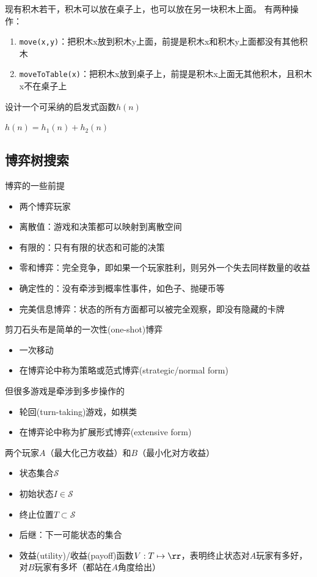 \begin{example}
现有积木若干，积木可以放在桌子上，也可以放在另一块积木上面。
有两种操作：
\begin{enumerate}
	\item \verb'move(x,y)'：把积木x放到积木y上面，前提是积木x和积木y上面都没有其他积木
	\item \verb'moveToTable(x)'：把积木x放到桌子上，前提是积木x上面无其他积木，且积木x不在桌子上
\end{enumerate}
设计一个可采纳的启发式函数$h(n)$
\end{example}
\begin{analysis}
$h(n)=h_1(n)+h_2(n)$
\end{analysis}

\subsection{博弈树搜索}
博弈的一些前提
\begin{itemize}
	\item 两个博弈玩家
	\item 离散值：游戏和决策都可以映射到离散空间
	\item 有限的：只有有限的状态和可能的决策
	\item 零和博弈：完全竞争，即如果一个玩家胜利，则另外一个失去同样数量的收益
	\item 确定性的：没有牵涉到概率性事件，如色子、抛硬币等
	\item 完美信息博弈：状态的所有方面都可以被完全观察，即没有隐藏的卡牌
\end{itemize}

剪刀石头布是简单的一次性(one-shot)博弈
\begin{itemize}
	\item 一次移动
	\item 在博弈论中称为策略或范式博弈(strategic/normal form)
\end{itemize}

但很多游戏是牵涉到多步操作的
\begin{itemize}
	\item 轮回(turn-taking)游戏，如棋类
	\item 在博弈论中称为扩展形式博弈(extensive form)
\end{itemize}

两个玩家$A$（最大化己方收益）和$B$（最小化对方收益）
\begin{itemize}
	\item 状态集合$\mathcal{S}$
	\item 初始状态$I\in\mathcal{S}$
	\item 终止位置$T\subset\mathcal{S}$
	\item 后继：下一可能状态的集合
	\item 效益(utility)/收益(payoff)函数$V:T\mapsto\rr$，表明终止状态对$A$玩家有多好，对$B$玩家有多坏（都站在$A$角度给出）
\end{itemize}

